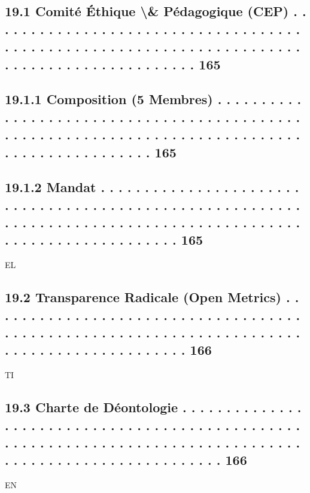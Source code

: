 \subsection{19.1    Comité Éthique \textbackslash{}& Pédagogique (CEP) . . . . . . . . . . . . . . . . . . . . . . . . . . . . . . . . . . . . . . . . . . . . . . . . . . . . . . . . . . . . . . . . . . . . . . . . . . . . . . . . . . . . . . . . . . . . 165}
\subsection{19.1.1             Composition (5 Membres) . . . . . . . . . . . . . . . . . . . . . . . . . . . . . . . . . . . . . . . . . . . . . . . . . . . . . . . . . . . . . . . . . . . . . . . . . . . . . . . . . . . . . . . . . . . . . . . 165}
\subsection{19.1.2             Mandat . . . . . . . . . . . . . . . . . . . . . . . . . . . . . . . . . . . . . . . . . . . . . . . . . . . . . . . . . . . . . . . . . . . . . . . . . . . . . . . . . . . . . . . . . . . . . . . . . . . . . . . . . . . . . . . 165}
\vspace{0.5em}
\vspace{0.5em}
\vspace{0.5em}
\vspace{0.5em}
EL\\
\subsection{19.2    Transparence Radicale (Open Metrics) . . . . . . . . . . . . . . . . . . . . . . . . . . . . . . . . . . . . . . . . . . . . . . . . . . . . . . . . . . . . . . . . . . . . . . . . . . . . . . . . . . . . . . . . . . . 166}
\vspace{0.5em}
\vspace{0.5em}
\vspace{0.5em}
\vspace{0.5em}
TI\\
\subsection{19.3    Charte de Déontologie . . . . . . . . . . . . . . . . . . . . . . . . . . . . . . . . . . . . . . . . . . . . . . . . . . . . . . . . . . . . . . . . . . . . . . . . . . . . . . . . . . . . . . . . . . . . . . . . . . . . . . . . . . . 166}
\vspace{0.5em}
\vspace{0.5em}
\vspace{0.5em}
\vspace{0.5em}
EN\\
